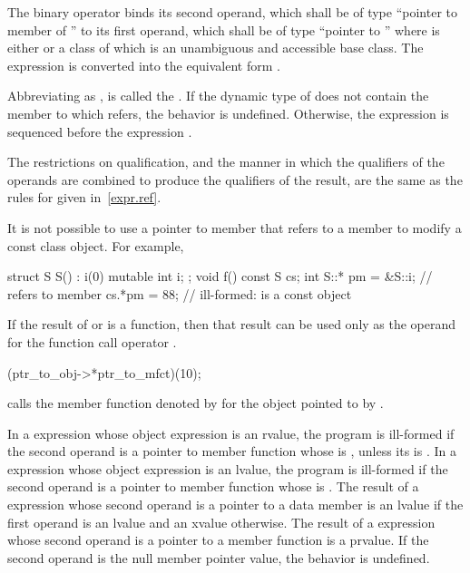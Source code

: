 \pnum
The binary operator \tcode{->*} binds its second operand, which shall be
of type ``pointer to member of '' to its first operand, which shall be of
type ``pointer to ''
where  is either  or
a class of which 
is an unambiguous and accessible base class.
The expression  is converted into the equivalent form
.

\pnum
Abbreviating  as , 
is called the .
If the dynamic type of  does not
contain the member to which
 refers, the behavior is undefined.
Otherwise, the expression  is sequenced before the expression .

\pnum
The restrictions on qualification, and the manner in which
the qualifiers of the operands are combined to produce the
qualifiers of the result, are the same as the rules for
 given in~\ref{expr.ref}.
\begin{note}
It is not possible to use a pointer to member that refers to a
 member to modify a const class object. For
example,

\begin{codeblock}
struct S {
  S() : i(0) { }
  mutable int i;
};
void f()
{
const S cs;
int S::* pm = &S::i;            //  refers to  member 
cs.*pm = 88;                    // ill-formed:  is a const object
}
\end{codeblock}
\end{note}

\pnum
{}%
If the result of  or \tcode{->*} is a function, then that
result can be used only as the operand for the function call operator
\tcode{()}.
\begin{example}

\begin{codeblock}
(ptr_to_obj->*ptr_to_mfct)(10);
\end{codeblock}

calls the member function denoted by  for the object
pointed to by .
\end{example}
In a  expression whose object expression is an rvalue, the program is
ill-formed if the second operand is a pointer to member function
whose  is \tcode{\&},
unless its  is .
In a 
expression whose object expression is an lvalue, the program is ill-formed if the second
operand is
a pointer to member function
whose  is \tcode{\&\&}.
The result of a  expression
whose second operand is a pointer to a data member is an lvalue if the first
operand is an lvalue and an xvalue otherwise. The result of a  expression whose
second operand is a pointer to a member function is a prvalue.
If the second operand is the null
member pointer value, the behavior is undefined.

